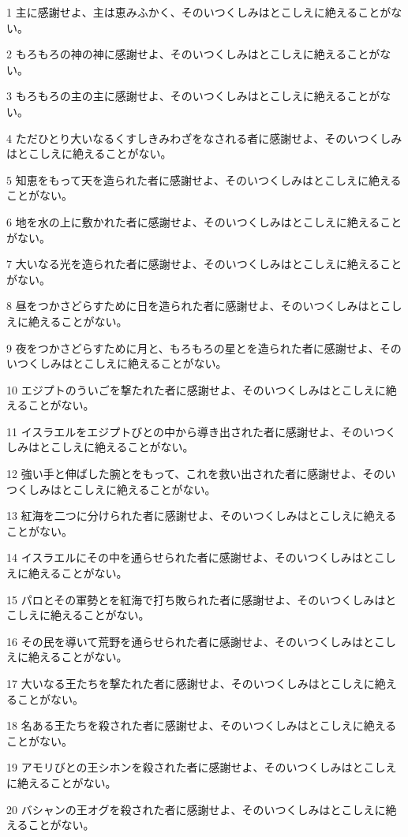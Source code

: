 \par 1 主に感謝せよ、主は恵みふかく、そのいつくしみはとこしえに絶えることがない。
\par 2 もろもろの神の神に感謝せよ、そのいつくしみはとこしえに絶えることがない。
\par 3 もろもろの主の主に感謝せよ、そのいつくしみはとこしえに絶えることがない。
\par 4 ただひとり大いなるくすしきみわざをなされる者に感謝せよ、そのいつくしみはとこしえに絶えることがない。
\par 5 知恵をもって天を造られた者に感謝せよ、そのいつくしみはとこしえに絶えることがない。
\par 6 地を水の上に敷かれた者に感謝せよ、そのいつくしみはとこしえに絶えることがない。
\par 7 大いなる光を造られた者に感謝せよ、そのいつくしみはとこしえに絶えることがない。
\par 8 昼をつかさどらすために日を造られた者に感謝せよ、そのいつくしみはとこしえに絶えることがない。
\par 9 夜をつかさどらすために月と、もろもろの星とを造られた者に感謝せよ、そのいつくしみはとこしえに絶えることがない。
\par 10 エジプトのういごを撃たれた者に感謝せよ、そのいつくしみはとこしえに絶えることがない。
\par 11 イスラエルをエジプトびとの中から導き出された者に感謝せよ、そのいつくしみはとこしえに絶えることがない。
\par 12 強い手と伸ばした腕とをもって、これを救い出された者に感謝せよ、そのいつくしみはとこしえに絶えることがない。
\par 13 紅海を二つに分けられた者に感謝せよ、そのいつくしみはとこしえに絶えることがない。
\par 14 イスラエルにその中を通らせられた者に感謝せよ、そのいつくしみはとこしえに絶えることがない。
\par 15 パロとその軍勢とを紅海で打ち敗られた者に感謝せよ、そのいつくしみはとこしえに絶えることがない。
\par 16 その民を導いて荒野を通らせられた者に感謝せよ、そのいつくしみはとこしえに絶えることがない。
\par 17 大いなる王たちを撃たれた者に感謝せよ、そのいつくしみはとこしえに絶えることがない。
\par 18 名ある王たちを殺された者に感謝せよ、そのいつくしみはとこしえに絶えることがない。
\par 19 アモリびとの王シホンを殺された者に感謝せよ、そのいつくしみはとこしえに絶えることがない。
\par 20 バシャンの王オグを殺された者に感謝せよ、そのいつくしみはとこしえに絶えることがない。
